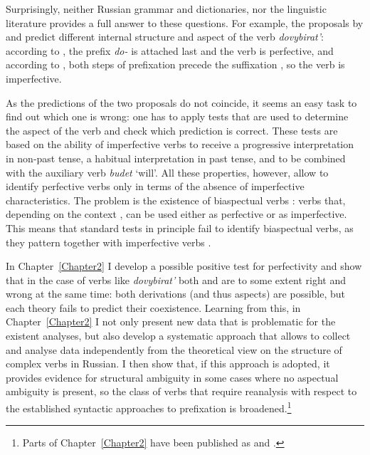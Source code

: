 Surprisingly, neither Russian grammar and dictionaries, nor the linguistic literature provides a full answer to these questions. For example, the proposals by \citet{Svenonius:04b} and \citet{Tatevosov:07} predict different internal structure and aspect of the verb \textit{dovybirat'}: according to \citet{Svenonius:04b}, the prefix \textit{do-}   is attached last and the verb is perfective, and according to \citet{Tatevosov:07}, both steps of prefixation  precede the suffixation  , so the verb is imperfective.

As the predictions of the two proposals do not coincide, it seems an easy task to find out which one is wrong: one has to apply tests that are used to determine the aspect  of the verb and check which prediction is correct. These tests are based on the ability of imperfective verbs  to receive a progressive interpretation  in non-past   tense, a habitual interpretation in past  tense, and to be combined with the auxiliary verb \textit{budet} `will'. All these properties, however, allow to identify perfective verbs  only in terms of the absence of imperfective characteristics. The problem is the existence of biaspectual verbs : verbs that, depending on the context  , can be used either as perfective or as imperfective. This means that standard tests in principle fail to identify biaspectual verbs, as they pattern together with imperfective verbs .

In Chapter~\ref{Chapter2} I develop a possible positive test for perfectivity  and show that in the case of verbs like \textit{dovybirat'} both \citet{Svenonius:04b} and \citet{Tatevosov:07} are to some extent right and wrong at the same time: both derivations (and thus aspects) are possible, but each theory fails to predict their coexistence. Learning from this, in Chapter~\ref{Chapter2} I not only present new data that is problematic for the existent analyses, but also develop a systematic approach that allows to collect and analyse data independently from the theoretical view on the structure of complex verbs  in Russian. I then show that, if this approach is adopted, it provides evidence for structural ambiguity  in some cases where no aspectual ambiguity is present, so the class of verbs that require reanalysis with respect to the established syntactic approaches to prefixation  is broadened.\footnote{Parts of Chapter~\ref{Chapter2} have been published as \citealt{ZinovaFilip:13} and \citealt{ZinovaOsswald:paper}.}

